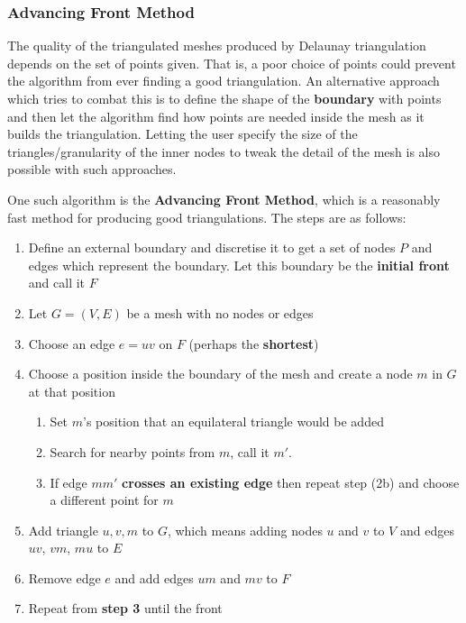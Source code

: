 \documentclass{article}
\begin{document}
\subsubsection{Advancing Front Method}

The quality of the triangulated meshes produced by Delaunay triangulation depends on the set of points given. That is, a poor choice of points could prevent the algorithm from ever finding a good triangulation. An alternative approach which tries to combat this is to define the shape of the \textbf{boundary} with points and then let the algorithm find how points are needed inside the mesh as it builds the triangulation. Letting the user specify the size of the triangles/granularity of the inner nodes to tweak the detail of the mesh is also possible with such approaches.

One such algorithm is the \textbf{Advancing Front Method}, which is a reasonably fast method for producing good triangulations. The steps are as follows:
\begin{enumerate}
	\item Define an external boundary and discretise it to get a set of nodes $P$ and edges which represent the boundary. Let this boundary be the \textbf{initial front} and call it $F$
	\item Let $G = (V, E)$ be a mesh with no nodes or edges
	\item Choose an edge $e = uv$ on $F$ (perhaps the \textbf{shortest})
	\item Choose a position inside the boundary of the mesh and create a node $m$ in $G$ at that position
	\begin{enumerate}
		\item Set $m$'s position that an equilateral triangle would be added
		\item Search for nearby points from $m$, call it $m'$.
		\item If edge $mm'$ \textbf{crosses an existing edge} then repeat step (2b) and choose a different point for $m$
	\end{enumerate}
	\item Add triangle $u,v,m$ to $G$, which means adding nodes $u$ and $v$ to $V$ and edges $uv$, $vm$, $mu$ to $E$
	\item Remove edge $e$ and add edges $um$ and $mv$ to $F$
	\item Repeat from \textbf{step 3} until the front
\end{enumerate}
\end{document}
